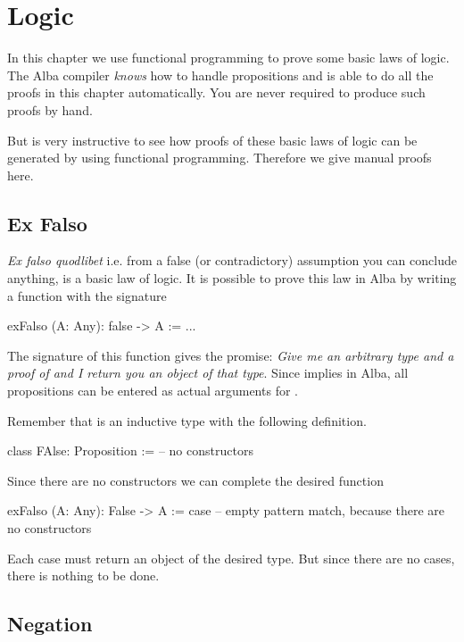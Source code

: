\newpage
\section{Logic}
\label{sec:certprog-logic}


In this chapter we use functional programming to prove some basic laws of
logic. The Alba compiler \emph{knows} how to handle propositions and is able
to do all the proofs in this chapter automatically. You are never required to
produce such proofs by hand.

But is very instructive to see how proofs of these basic laws of logic can be
generated by using functional programming. Therefore we give manual proofs
here.



\subsection{Ex Falso}

\emph{Ex falso quodlibet} i.e. from a false (or contradictory) assumption you
can conclude anything, is a basic law of logic. It is possible to prove this
law in Alba by writing a function with the signature

\begin{alba}
    exFalso (A: Any): false -> A := ...
\end{alba}
%
The signature of this function gives the promise: \emph{Give me an arbitrary
type and a proof of  and I return you an object of that type}. Since
 implies  in Alba, all propositions can be
entered as actual arguments for .


Remember that  is an inductive type with the following definition.
\begin{alba}
    class FAlse: Proposition := -- no constructors
\end{alba}
%
Since there are no constructors we can complete the desired function

\begin{alba}
    exFalso (A: Any): False -> A :=
        case
            -- empty pattern match, because there are no constructors
\end{alba}
%
Each case must return an object of the desired type. But since there are no
cases, there is nothing to be done.






\subsection{Negation}

